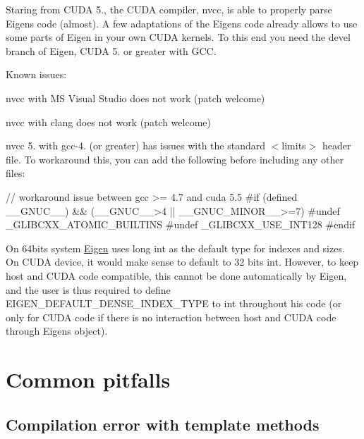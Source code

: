 Staring from C\+U\+DA 5., the C\+U\+DA compiler, {\ttfamily nvcc}, is able to properly parse Eigen\textquotesingle{}s code (almost). A few adaptations of the Eigen\textquotesingle{}s code already allows to use some parts of Eigen in your own C\+U\+DA kernels. To this end you need the devel branch of Eigen, C\+U\+DA 5. or greater with G\+CC.

Known issues\+:


\begin{DoxyItemize}
\item {\ttfamily nvcc} with MS Visual Studio does not work (patch welcome)
\item {\ttfamily nvcc} with {\ttfamily clang} does not work (patch welcome)
\item {\ttfamily nvcc} 5. with gcc-\/4. (or greater) has issues with the standard {\ttfamily $<$limits$>$} header file. To workaround this, you can add the following before including any other files\+: 
\begin{DoxyCode}
\textcolor{comment}{// workaround issue between gcc >= 4.7 and cuda 5.5}
\textcolor{preprocessor}{#if (defined \_\_GNUC\_\_) && (\_\_GNUC\_\_>4 || \_\_GNUC\_MINOR\_\_>=7)}
\textcolor{preprocessor}{  #undef \_GLIBCXX\_ATOMIC\_BUILTINS}
\textcolor{preprocessor}{  #undef \_GLIBCXX\_USE\_INT128}
\textcolor{preprocessor}{#endif}
\end{DoxyCode}

\item On 64bits system \hyperlink{namespace_eigen}{Eigen} uses {\ttfamily long} {\ttfamily int} as the default type for indexes and sizes. On C\+U\+DA device, it would make sense to default to 32 bits {\ttfamily int}. However, to keep host and C\+U\+DA code compatible, this cannot be done automatically by Eigen, and the user is thus required to define {\ttfamily E\+I\+G\+E\+N\+\_\+\+D\+E\+F\+A\+U\+L\+T\+\_\+\+D\+E\+N\+S\+E\+\_\+\+I\+N\+D\+E\+X\+\_\+\+T\+Y\+PE} to {\ttfamily int} throughout his code (or only for C\+U\+DA code if there is no interaction between host and C\+U\+DA code through Eigen\textquotesingle{}s object). 
\end{DoxyItemize}\hypertarget{TopicPitfalls}{}\section{Common pitfalls}\label{TopicPitfalls}
\hypertarget{_topic_pitfalls_TopicPitfalls_template_keyword}{}\subsection{Compilation error with template methods}\label{_topic_pitfalls_TopicPitfalls_template_keyword}
